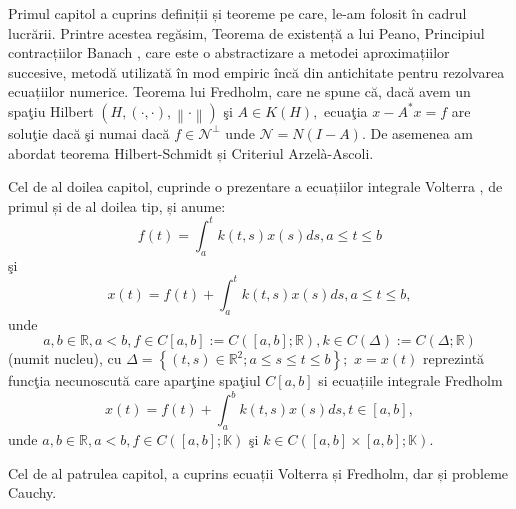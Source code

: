 \documentclass[a4paper,12pt,oneside]{report}
\begin{document}
Primul capitol a cuprins definiții și teoreme pe care, le-am folosit în cadrul lucrării. Printre acestea regăsim, Teorema de existență a lui Peano, Principiul contracțiilor Banach , care este o abstractizare a metodei aproximațiilor succesive, metodă utilizată în mod empiric încă din antichitate pentru rezolvarea ecuațiilor numerice. Teorema lui Fredholm, care ne spune că, dacă avem un spa\c{t}iu Hilbert \(\left ( H, \left ( \cdot ,\cdot  \right ), \left \| \cdot  \right \| \right )\)  \c{s}i  \(A \in K\left ( H \right ),\) ecua\c{t}ia \(x - A^{\ast }x = f\) are solu\c{t}ie dac\u{a} \c{s}i numai dac\u{a} \(f \in { \mathcal{N}} ^{\perp }\) unde \({ \mathcal{N}} = N\left ( I - A \right ). \)  De asemenea am abordat teorema Hilbert-Schmidt și Criteriul Arzelà-Ascoli.

Cel de al doilea capitol, cuprinde o prezentare a ecuațiilor integrale  Volterra , de primul și de al doilea tip, și anume:
\begin{displaymath}
f\left ( t \right ) = \int_{a}^{t}k\left ( t,s \right )x\left ( s \right )ds,    a\leq t\leq b  
\end{displaymath}
\c{s}i
\begin{displaymath}
x\left ( t \right ) = f\left ( t \right ) + \int_{a}^{t}k\left ( t,s \right )x\left ( s \right )ds, a\leq t\leq b, 
\end{displaymath}
unde \[a,b \in \mathbb{R}, a< b, f\in C\left [ a,b \right ]:= C\left ( \left [ a,b \right ];\mathbb{R} \right ), k\in C\left (\Delta   \right ):= C\left ( \Delta ;\mathbb{R} \right )\] (numit nucleu), cu \(\Delta =\left \{ \left ( t,s \right )\in \mathbb{R}^{2};a\leq s\leq t\leq b \right \};\) \(x=x\left ( t \right )\) reprezint\u{a} func\c{t}ia necunoscut\u{a} care apar\c{t}ine spa\c{t}iul \(C\left [ a,b \right ]\)
si ecuațiile integrale  Fredholm
\begin{displaymath}
x\left ( t \right ) = f\left ( t \right ) + \int_{a}^{b}k\left ( t,s \right )x\left ( s \right )ds, t\in \left [ a,b \right ], 
\end{displaymath}
unde \(a,b \in \mathbb{R}, a< b, f\in C\left ( \left [ a,b \right ]; \mathbb{K}\right )\) \c{s}i \(k\in C\left ( \left [ a,b \right ] \times \left [ a,b \right ]; \mathbb{K}\right ).\)

Cel de al patrulea capitol, a cuprins ecuații Volterra și Fredholm, dar și probleme Cauchy. 



\setlength{\baselineskip}{\normalbaselineskip}
\setlength{\parskip}{0pt}

\end{document}
